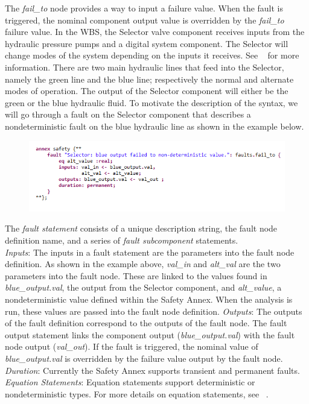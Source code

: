 The \textit{fail\_to} node provides a way to input a failure value. When the fault is triggered, the nominal component output value is overridden by the \textit{fail\_to} failure value. In the WBS, the Selector valve component receives inputs from the hydraulic pressure pumps and a digital system component. The Selector will change modes of the system depending on the inputs it receives. See ~\cite{AIR6110,Stewart17:IMBSA} for more information. There are two main hydraulic lines that feed into the Selector, namely the green line and the blue line; respectively the normal and alternate modes of operation. The output of the Selector component will either be the green or the blue hydraulic fluid. To motivate the description of the syntax, we will go through a fault on the Selector component that describes a nondeterministic fault on the blue hydraulic line as shown in the example below. 
\begin{figure}[h!]
\vspace{-0.17in}
\begin{center}
\includegraphics[trim=0 15 0 11,clip,width=1.0\textwidth]{images/annex.png}
\end{center}
\vspace{-0.40in}
\end{figure}

The \textit{fault statement} consists of a unique description string, the fault node definition name, and a series of \textit{fault subcomponent} statements. \\
\textit{Inputs}: The inputs in a fault statement are the parameters into the fault node definition. As shown in the example above, \textit{val\_in} and \textit{alt\_val} are the two parameters into the fault node. These are linked to the values found in \textit{blue\_output.val}, the output from the Selector component, and \textit{alt\_value}, a nondeterministic value defined within the Safety Annex. When the analysis is run, these values are passed into the fault node definition. 
\textit{Outputs}: The outputs of the fault definition correspond to the outputs of the fault node. The fault output statement links the component output (\textit{blue\_output.val}) with the fault node output (\textit{val\_out}). If the fault is triggered, the nominal value of \textit{blue\_output.val} is overridden by the failure value output by the fault node.
\textit{Duration}: Currently the Safety Annex supports transient and permanent faults. 
\textit{Equation Statements}: Equation statements support deterministic or nondeterministic types. For more details on equation statements, see ~\cite{NFM2012:CoGaMiWhLaLu}.\\





